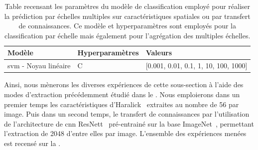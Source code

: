 \begin{table}[H]
    \centering
    \begin{tabular}{lll}
        \toprule
        \textbf{Modèle}                                 & \textbf{Hyperparamètres}  & \textbf{Valeurs}                          \\ \midrule
        \gls{svm} - Noyau linéaire                      & C                         & [0.001, 0.01, 0.1, 1, 10, 100, 1000]      \\ 
        \bottomrule 
    \end{tabular} 
    \caption{Table recensant les paramètres du modèle de classification employé pour réaliser la prédiction par échelles multiples sur caractéristiques spatiales ou par transfert de connaissances. Ce modèle et hyperparamètres sont employés pour la classification par échelle mais également pour l'agrégation des multiples échelles.}
    \label{tab:parameters_image_improvement_models_multiscale_spatial}
\end{table}\par

Ainsi, nous mènerons les diverses expériences de cette sous-section à l'aide des modes d'extraction précédemment étudié dans le . Nous emploierons dans un premier temps les caractéristiques d'Haralick~\cite{Haralick1973} extraites au nombre de 56 par image. Puis dans un second temps, le transfert de connaissances par l'utilisation de l'architecture de \gls{cnn} ResNett~\cite{He2016} pré-entrainé sur la base ImageNet~\cite{Canziani2016}, permettant l'extraction de 2048 d'entre elles par image. L'ensemble des expériences menées est recensé sur la .\par

